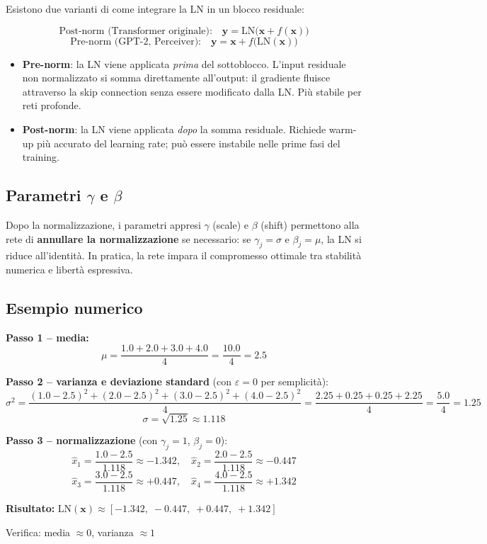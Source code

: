 \documentclass[
  11pt,
]{article}
\begin{document}
Esistono due varianti di come integrare la LN in un blocco residuale:

\begin{formulabox}[title={\textbf{Pre-norm vs Post-norm}}]
\[
\text{Post-norm (Transformer originale):}\quad \mathbf{y} = \text{LN}\bigl(\mathbf{x} + f(\mathbf{x})\bigr)
\]
\[
\text{Pre-norm (GPT-2, Perceiver):}\quad \mathbf{y} = \mathbf{x} + f\bigl(\text{LN}(\mathbf{x})\bigr)
\]
\end{formulabox}

\begin{itemize}
  \item \textbf{Pre-norm}: la LN viene applicata \emph{prima} del sottoblocco. L'input residuale non normalizzato si somma direttamente all'output: il gradiente fluisce attraverso la skip connection senza essere modificato dalla LN. Più stabile per reti profonde.
  \item \textbf{Post-norm}: la LN viene applicata \emph{dopo} la somma residuale. Richiede warm-up più accurato del learning rate; può essere instabile nelle prime fasi del training.
\end{itemize}

\subsection{Parametri $\gamma$ e $\beta$}

Dopo la normalizzazione, i parametri appresi $\gamma$ (scale) e $\beta$ (shift) permettono alla rete di \textbf{annullare la normalizzazione} se necessario: se $\gamma_j = \sigma$ e $\beta_j = \mu$, la LN si riduce all'identità. In pratica, la rete impara il compromesso ottimale tra stabilità numerica e libertà espressiva.

\subsection{Esempio numerico}

\begin{notabox}[title={\textbf{Esempio: $\mathbf{x} = [1.0,\;2.0,\;3.0,\;4.0]$, $D=4$}}]
\textbf{Passo 1 -- media:}
\[
\mu = \frac{1.0 + 2.0 + 3.0 + 4.0}{4} = \frac{10.0}{4} = 2.5
\]

\textbf{Passo 2 -- varianza e deviazione standard} (con $\varepsilon = 0$ per semplicità):
\[
\sigma^2 = \frac{(1.0-2.5)^2 + (2.0-2.5)^2 + (3.0-2.5)^2 + (4.0-2.5)^2}{4}
= \frac{2.25 + 0.25 + 0.25 + 2.25}{4} = \frac{5.0}{4} = 1.25
\]
\[
\sigma = \sqrt{1.25} \approx 1.118
\]

\textbf{Passo 3 -- normalizzazione} (con $\gamma_j = 1$, $\beta_j = 0$):
\[
\hat{x}_1 = \frac{1.0 - 2.5}{1.118} \approx -1.342, \quad
\hat{x}_2 = \frac{2.0 - 2.5}{1.118} \approx -0.447
\]
\[
\hat{x}_3 = \frac{3.0 - 2.5}{1.118} \approx +0.447, \quad
\hat{x}_4 = \frac{4.0 - 2.5}{1.118} \approx +1.342
\]

\textbf{Risultato:} $\text{LN}(\mathbf{x}) \approx [-1.342,\;-0.447,\;+0.447,\;+1.342]$

Verifica: media $\approx 0$, varianza $\approx 1$ \checkmark
\end{notabox}
\end{document}
